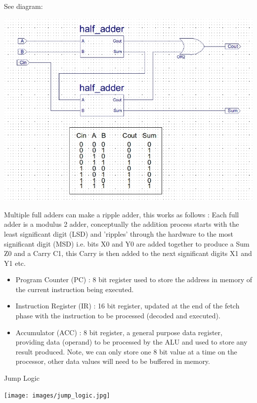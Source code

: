 See diagram:

\includegraphics[scale=1]{images/half_adders.jpg}

Multiple full adders can make a ripple adder, this works as follows : 
Each full adder is a modulus 2 adder, conceptually the addition process starts with the least significant digit (LSD) and 'ripples' through the hardware to the most significant digit (MSD) i.e. bits X0 and Y0 are added together to produce a Sum Z0 and a Carry C1, this Carry is then added to the next significant digits X1 and Y1 etc.

\begin{itemize}
	\item Program Counter (PC) : 8 bit register used to store the address in memory of the current instruction being executed.
	\item Instruction Register (IR) : 16 bit register, updated at the end of the fetch phase with the instruction to be processed (decoded and executed).
	\item Accumulator (ACC) : 8 bit register, a general purpose data register, providing data (operand) to be processed by the ALU and used to store any result produced. Note, we can only store one 8 bit value at a time on the processor, other data values will need to be buffered in memory.
\end{itemize}

Jump Logic 

\texttt{[image: images/jump\_logic.jpg]}



